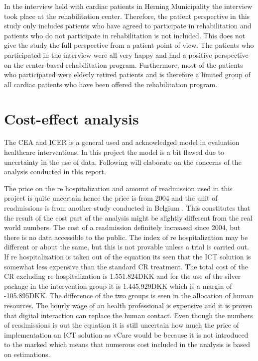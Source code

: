 In the interview held with cardiac patients in Herning Municipality the interview took place at the rehabilitation center. Therefore, the patient perspective in this study only includes patients who have agreed to participate in rehabilitation and patients who do not participate in rehabilitation is not included. This does not give the study the full perspective from a patient point of view. The patients who participated in the interview were all very happy and had a positive perspective on the center-based rehabilitation program. Furthermore, most of the patients who participated were elderly retired patients and is therefore a limited group of all cardiac patients who have been offered the rehabilitation program. %

\section{Cost-effect analysis}


The CEA and ICER is a general used and acknowledged model in evaluation healthcare interventions.  In this project the model is a bit flawed due to uncertainty in the use of data.  Following will elaborate on the concerns of the analysis conducted in this report. 

The price on the re hospitalization and amount of readmission used in this project is quite uncertain hence the price is from 2004 and the unit of readmissions is from another study conducted in Belgium \cite{costeffect, rasmussen2011hjerterehabilitering}. This constitutes that the result of the cost part of the analysis might be slightly different from the real world numbers. The cost of a readmission definitely increased since 2004, but there is no data accessible to the public. The index of re hospitalization may be different or about the same, but this is not provable unless a trial is carried out. 
If re hospitalization is taken out of the equation its seen that the ICT solution is somewhat less expensive than the standard CR treatment. The total cost of the CR excluding re hospitalization is 1.551.824DKK and for the use of the silver package in the intervention group it is 1.445.929DKK which is a margin of -105.895DKK. The difference of the two groups is seen in the allocation of human resources. The hourly wage of an health professional is expensive and it is proven that digital interaction can replace the human contact. Even though the numbers of readmissions is out the equation it is still uncertain how much the price of implementation an ICT solution as vCare would be because it is not introduced to the marked which means that numerous cost included in the analysis is based on estimations. 

